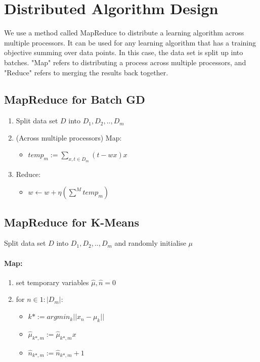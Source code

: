 \documentclass[]{article}
\begin{document}
\section{Distributed Algorithm Design}

\textnormal{We use a method called MapReduce to distribute a learning algorithm across multiple processors. It can be used for any learning algorithm that has a training objective summing over data points. In this case, the data set is split up into batches. "Map" refers to distributing a process across multiple processors, and "Reduce" refers to merging the results back together.}
\subsection{MapReduce for Batch GD}
\begin{enumerate}
	\item Split data set $D$ into $D_1, D_2, .., D_m$
	\item (Across multiple processors) Map:
	\begin{itemize}
		\item $temp_m := \sum_{x,t \in D_m} (t - w x)x$
	\end{itemize}
	\item{Reduce:}
	\begin{itemize}
		\item $w \leftarrow w + \eta (\sum^M temp_m)$
	\end{itemize}
\end{enumerate}

\subsection{MapReduce for K-Means}
\textnormal{Split data set $D$ into $D_1, D_2, .., D_m$ and randomly initialise $\mu$}
\paragraph{Map:}
\begin{enumerate}
	\item set temporary variables $\hat \mu, \hat n = 0$
	\item for $n \in 1:|D_m|$:
	\begin{itemize}
		\item $k* := argmin_k ||x_n-\mu_k||$
		\item $\hat \mu_{k*,m} := \hat \mu_{k*,m}x$
		\item $\hat n_{k*,m} := \hat n_{k*,m} + 1$
	\end{itemize}
\end{enumerate}
\end{document}
